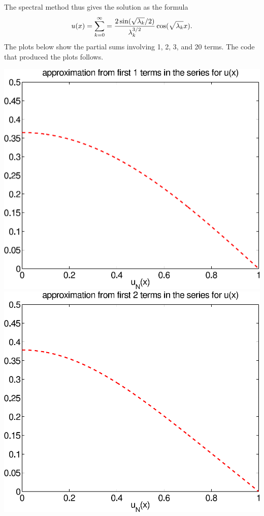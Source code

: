 {\begin{solution}
\begin{enumerate}
The spectral method thus gives the solution as the formula
\[ u(x) = \sum_{k=0}^\infty = {2 \sin(\sqrt{\lambda_k}/2) \over \lambda_k^{3/2}}
                                 \cos(\sqrt{\lambda_k} x).\]
The plots below show the partial sums involving
1, 2, 3, and 20 terms.  The code that produced the plots follows.
\begin{center}
   \includegraphics[scale=0.4]{bvps3_1a}\quad
   \includegraphics[scale=0.4]{bvps3_2a}


\end{center}
\end{enumerate}
\end{solution}}
